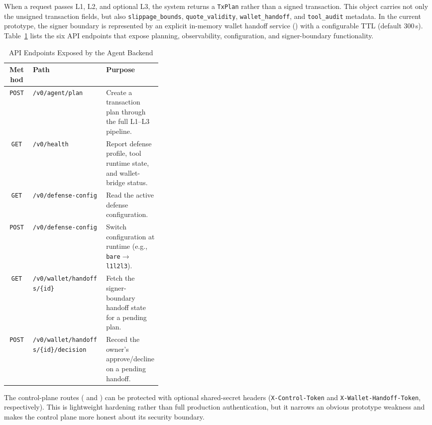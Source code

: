 ﻿\documentclass[conference]{IEEEtran}
\begin{document}
When a request passes L1, L2, and optional L3, the system returns a
\texttt{TxPlan} rather than a signed transaction. This object carries not only
the unsigned transaction fields, but also \texttt{slippage\_bounds},
\texttt{quote\_validity}, \texttt{wallet\_handoff}, and \texttt{tool\_audit}
metadata. In the current prototype, the signer boundary is represented by an
explicit in-memory wallet handoff service
() with a configurable TTL (default
300\,s). Table~\ref{tab:api-endpoints} lists the six API endpoints that expose
planning, observability, configuration, and signer-boundary functionality.

\begin{table}[!htbp]
\centering
\caption{API Endpoints Exposed by the Agent Backend}
\label{tab:api-endpoints}
\small
\begin{tabularx}{\linewidth}{c >{\raggedright\arraybackslash}X >{\raggedright\arraybackslash}p{0.36\linewidth}}
\toprule
\textbf{Method} & \textbf{Path} & \textbf{Purpose} \\
\midrule
\texttt{POST} & \nolinkurl{/v0/agent/plan} & Create a transaction plan through the full L1--L3 pipeline. \\
\texttt{GET} & \nolinkurl{/v0/health} & Report defense profile, tool runtime state, and wallet-bridge status. \\
\texttt{GET} & \nolinkurl{/v0/defense-config} & Read the active defense configuration. \\
\texttt{POST} & \nolinkurl{/v0/defense-config} & Switch configuration at runtime (e.g., \texttt{bare}$\to$\texttt{l1l2l3}). \\
\texttt{GET} & \nolinkurl{/v0/wallet/handoffs/{id}} & Fetch the signer-boundary handoff state for a pending plan. \\
\texttt{POST} & \nolinkurl{/v0/wallet/handoffs/{id}/decision} & Record the owner's approve/decline on a pending handoff. \\
\bottomrule
\end{tabularx}
\end{table}

The control-plane routes ( and
) can be protected with optional shared-secret
headers (\texttt{X-Control-Token} and \texttt{X-Wallet-Handoff-Token},
respectively). This is lightweight hardening rather than full production
authentication, but it narrows an obvious prototype weakness and makes the
control plane more honest about its security boundary.
\end{document}

